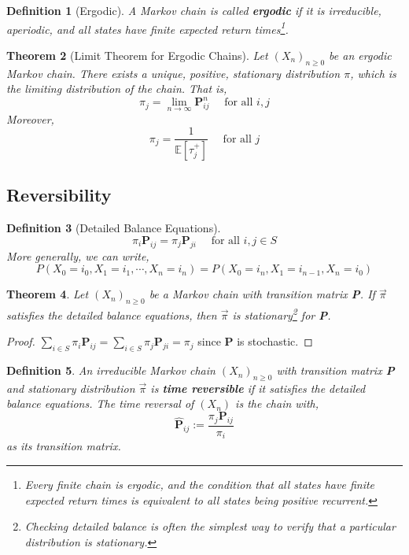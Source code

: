 \documentclass{tufte-handout}
\newtheorem{thm}{Theorem}
\newtheorem{defn}[thm]{Definition}
\begin{document}
  \begin{defn}[Ergodic]
    A Markov chain is called \textbf{ergodic} if it is irreducible, aperiodic, and all states have finite expected return times\footnote{Every finite chain is ergodic, and the condition that all states have finite expected return times is equivalent to all states being positive recurrent.}.
  \end{defn}

  \begin{thm}[Limit Theorem for Ergodic Chains]
    Let $(X_n)_{n \geq 0}$ be an ergodic Markov chain. There exists a unique, positive, stationary distribution $\pi$, which is the limiting distribution of the chain. That is,
    \[\pi_j = \lim_{n \rightarrow \infty}\boldsymbol{P}_{ij}^n \quad \text{ for all $i,j$}\]
    \noindent Moreover,
    \[\pi_j = \frac{1}{\mathbb{E}[\tau^+_j]} \quad \text{ for all $j$}\] 
  \end{thm}

  \subsection{Reversibility}
  \begin{defn}[Detailed Balance Equations]
  \[\pi_i\boldsymbol{P}_{ij} = \pi_j\boldsymbol{P}_{ji} \quad \text{ for all $i,j \in S$}\]
  \noindent More generally, we can write,
  \[P(X_0 = i_0, X_1 = i_1, \cdots, X_n = i_n) = P(X_0 = i_n, X_1 = i_{n-1}, X_n = i_0)\]
  \end{defn}

  \begin{thm}
    Let $(X_n)_{n \geq 0}$ be a Markov chain with transition matrix \textbf{P}. If $\Vec{\pi}$ satisfies the detailed balance equations, then $\Vec{\pi}$ is stationary\footnote{Checking detailed balance is often the simplest way to verify that a particular distribution is stationary.} for \textbf{P}. 
  \end{thm}

  \begin{proof}
    $\sum_{i \in S} \pi_i\boldsymbol{P}_{ij} = \sum_{i \in S}\pi_j\boldsymbol{P}_{ji} = \pi_j$ since \textbf{P} is stochastic.
  \end{proof}

  \begin{defn}
    An irreducible Markov chain $(X_n)_{n \geq 0}$ with transition matrix \textbf{P} and stationary distribution $\Vec{\pi}$ is \textbf{time reversible} if it satisfies the detailed balance equations. The time reversal of $(X_n)$ is the chain with,
    \[\hat{\boldsymbol{P}}_{ij} := \frac{\pi_j\boldsymbol{P}_{ij}}{\pi_i}\]
    \noindent as its transition matrix.
  \end{defn}
\end{document}

